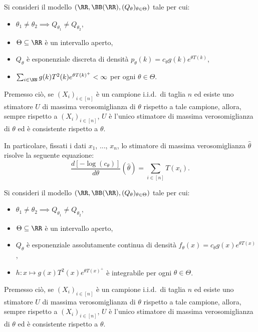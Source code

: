 \begin{multicols*}{2}
\begin{theorem}
    Si consideri il modello $(\RR, \BB(\RR), (Q_\theta)_{\theta \in \Theta})$ tale per cui:
    \begin{itemize}
        \item $\theta_1 \neq \theta_2 \implies Q_{\theta_1} \neq Q_{\theta_2}$,
        \item $\Theta \subseteq \RR$ è un intervallo aperto,
        \item $Q_\theta$ è esponenziale discreta di densità
        $p_\theta(k) = c_\theta g(k) e^{\theta T(k)}$,
        \item $\sum_{i \in \NN} g(k) T^2(k) e^{\theta T(k)^+} < \infty$ per ogni $\theta \in \Theta$.
    \end{itemize}
    Premesso ciò, se $(X_i)_{i \in [n]}$ è un campione i.i.d.~di taglia $n$ ed esiste uno stimatore
    $U$ di massima verosomiglianza di $\theta$ rispetto a tale campione, allora, sempre rispetto
    a $(X_i)_{i \in [n]}$,
    $U$ è l'unico stimatore di massima verosomiglianza di $\theta$ ed è consistente rispetto a $\theta$. \smallskip

    In particolare, fissati i dati $x_1$, ..., $x_n$, lo stimatore di massima verosomiglianza $\hat\theta$ risolve la seguente equazione:
    \[
        \frac{d \left[- \log(c_\theta)\right]}{d\theta} \left(\hat\theta\right) = \sum_{i \in [n]} T(x_i).
    \]
\end{theorem}

\begin{theorem}
    Si consideri il modello $(\RR, \BB(\RR), (Q_\theta)_{\theta \in \Theta})$ tale per cui:
    \begin{itemize}
        \item $\theta_1 \neq \theta_2 \implies Q_{\theta_1} \neq Q_{\theta_2}$,
        \item $\Theta \subseteq \RR$ è un intervallo aperto,
        \item $Q_\theta$ è esponenziale assolutamente continua di densità
        $f_\theta(x) = c_\theta g(x) e^{\theta T(x)}$,
        \item $h : x \mapsto g(x) T^2(x) e^{\theta T(x)^+}$ è integrabile per ogni $\theta \in \Theta$.
    \end{itemize}
    Premesso ciò, se $(X_i)_{i \in [n]}$ è un campione i.i.d.~di taglia $n$ ed esiste uno stimatore
    $U$ di massima verosomiglianza di $\theta$ rispetto a tale campione, allora, sempre rispetto
    a $(X_i)_{i \in [n]}$,
    $U$ è l'unico stimatore di massima verosomiglianza di $\theta$ ed è consistente rispetto a $\theta$.
\end{theorem}


\end{multicols*}
